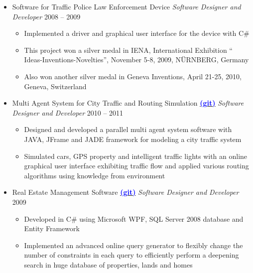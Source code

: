 \documentclass[letter]{res}
\begin{document}
\begin{resume}
\begin{itemize}[leftmargin=-.1in]
\item Software for Traffic Police Law Enforcement Device \newline
{\sl Software Designer and Developer} \hfill 2008 – 2009\\
   \vspace{-4mm}
   \iflong
      \begin{itemize}
        \item Implemented a driver and graphical user interface for the device with C\#
        \item This project won a silver medal in IENA, International Exhibition `` Ideas-Inventions-Novelties'', November 5-8, 2009, N\"{U}RNBERG, Germany
        \item Also won another silver medal in Geneva Inventions, April 21-25, 2010, Geneva, Switzerland
      \end{itemize}
   \fi
   
\item Multi Agent System for City Traffic and Routing Simulation {\href{https://github.com/omid55/city_routing_model_jade_mutli_agent_system}{\textbf{\textcolor{blue}{(git)}}}} \newline
{\sl Software Designer and Developer} \hfill 2010 – 2011\\
   \vspace{-4mm}
   \iflong
     \begin{itemize}
        \item Designed and developed a parallel multi agent system software with JAVA, JFrame and JADE framework for modeling a city traffic system
        \item Simulated cars, GPS property and intelligent traffic lights with an online graphical user interface exhibiting traffic flow and applied various routing algorithms using knowledge from environment
      \end{itemize}
	\fi
    
\item Real Estate Management Software {\href{https://github.com/omid55/real_state_manager}{\textbf{\textcolor{blue}{(git)}}}}
\newline
{\sl Software Designer and Developer} \hfill 2009\\
   \vspace{-4mm}
   \iflong
     \begin{itemize}
        \item Developed in C\# using Microsoft WPF, SQL Server 2008 database and Entity Framework
        \item Implemented an advanced online query generator to flexibly change the number of constraints in each query to efficiently perform a deepening search in huge database of properties, lands and homes
     \end{itemize}
   \fi
   

\end{itemize}
\end{resume}
\end{document}
